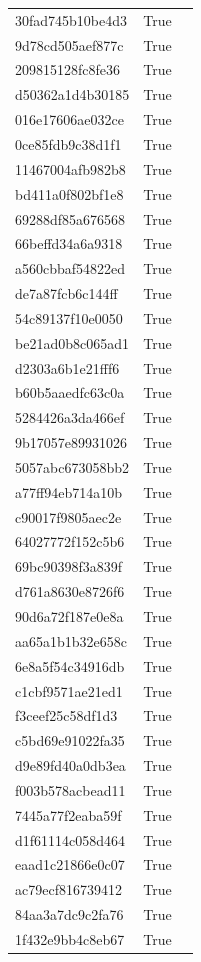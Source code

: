\begin{tabular}{lrl}
30fad745b10be4d3 & True &  \\
9d78cd505aef877c & True &  \\
209815128fc8fe36 & True &  \\
d50362a1d4b30185 & True &  \\
016e17606ae032ce & True &  \\
0ce85fdb9c38d1f1 & True &  \\
11467004afb982b8 & True &  \\
bd411a0f802bf1e8 & True &  \\
69288df85a676568 & True &  \\
66beffd34a6a9318 & True &  \\
a560cbbaf54822ed & True &  \\
de7a87fcb6c144ff & True &  \\
54c89137f10e0050 & True &  \\
be21ad0b8c065ad1 & True &  \\
d2303a6b1e21fff6 & True &  \\
b60b5aaedfc63c0a & True &  \\
5284426a3da466ef & True &  \\
9b17057e89931026 & True &  \\
5057abc673058bb2 & True &  \\
a77ff94eb714a10b & True &  \\
c90017f9805aec2e & True &  \\
64027772f152c5b6 & True &  \\
69bc90398f3a839f & True &  \\
d761a8630e8726f6 & True &  \\
90d6a72f187e0e8a & True &  \\
aa65a1b1b32e658c & True &  \\
6e8a5f54c34916db & True &  \\
c1cbf9571ae21ed1 & True &  \\
f3ceef25c58df1d3 & True &  \\
c5bd69e91022fa35 & True &  \\
d9e89fd40a0db3ea & True &  \\
f003b578acbead11 & True &  \\
7445a77f2eaba59f & True &  \\
d1f61114c058d464 & True &  \\
eaad1c21866e0c07 & True &  \\
ac79ecf816739412 & True &  \\
84aa3a7dc9c2fa76 & True &  \\
1f432e9bb4c8eb67 & True &  \\

\end{tabular}
